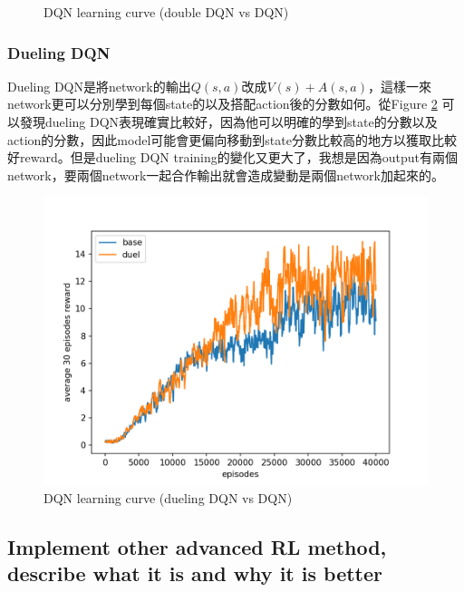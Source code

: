 \documentclass[12pt, a4paper]{article}
\begin{document}
\begin{CJK}{UTF8}{bkai}
\begin{figure}[!htb]
\caption{DQN learning curve (double DQN vs DQN)}
\label{fig:f8}
\end{figure}

\subsubsection{Dueling DQN}
Dueling DQN是將network的輸出$Q(s,a)$改成$V(s)+A(s,a)$，這樣一來network更可以分別學到每個state的以及搭配action後的分數如何。從Figure \ref{fig:f9} 可以發現dueling DQN表現確實比較好，因為他可以明確的學到state的分數以及action的分數，因此model可能會更偏向移動到state分數比較高的地方以獲取比較好reward。但是dueling DQN training的變化又更大了，我想是因為output有兩個network，要兩個network一起合作輸出就會造成變動是兩個network加起來的。
\begin{figure}[!htb]
\centering
\includegraphics[scale=0.7]{dqn_duel_avg_reward.png}

\caption{DQN learning curve (dueling DQN vs DQN)}
\label{fig:f9}
\end{figure}


\subsection{Implement other advanced RL method, describe what it is and why it is better}


\end{CJK}
\end{document}
